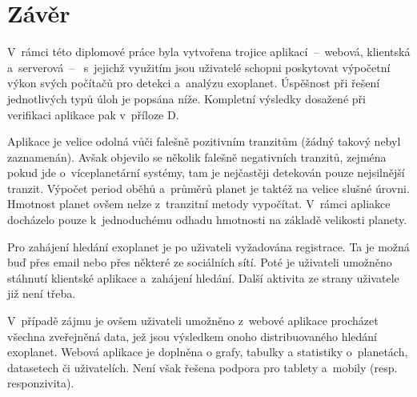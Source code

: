 \documentclass[a4paper,12pt]{article}
\begin{document}
{{{{{{{{{{{{

\clearpage\pagestyle{plain}
\section*{Závěr}

V~rámci této diplomové práce byla vytvořena trojice aplikací~--~webová, klientská a~serverová~--~ s~jejichž využitím jsou uživatelé schopni poskytovat výpočetní výkon svých počítačů pro detekci a~analýzu exoplanet. Úspěšnost při řešení jednotlivých typů úloh je popsána níže. Kompletní výsledky dosažené při verifikaci aplikace pak v~příloze D.

{

Aplikace je velice odolná vůči falešně pozitivním tranzitům (žádný takový nebyl zaznamenán). Avšak objevilo se několik falešně negativních tranzitů, zejména pokud jde o~víceplanetární systémy, tam je nejčastěji detekován pouze nejsilnější tranzit. Výpočet period oběhů a~průměrů planet je taktéž na velice slušné úrovni. Hmotnost planet ovšem nelze z~tranzitní metody vypočítat. V~rámci apliakce docházelo pouze k~jednoduchému odhadu hmotnosti na základě velikosti planety.


Pro zahájení hledání exoplanet je po uživateli vyžadována registrace. Ta je možná buď přes email nebo přes některé ze sociálních sítí. Poté je uživateli umožněno stáhnutí klientské aplikace a~zahájení hledání. Další aktivita ze strany uživatele již není třeba.

V~případě zájmu je ovšem uživateli umožněno z~webové aplikace procházet všechna zveřejněná data, jež jsou výsledkem onoho distribuovaného hledání exoplanet. Webová aplikace je doplněna o grafy, tabulky a statistiky o~planetách, datasetech či uživatelích. Není však řešena podpora pro tablety a~mobily (resp. responzivita).

}}}}}}}}}}}}}
\end{document}
